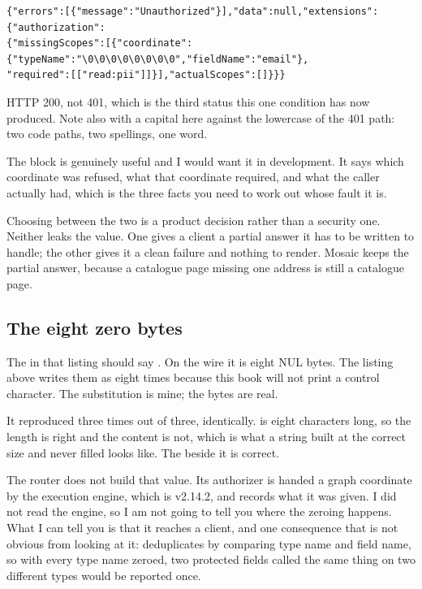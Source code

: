 \begin{verbatim}
{"errors":[{"message":"Unauthorized"}],"data":null,"extensions":{"authorization":
{"missingScopes":[{"coordinate":{"typeName":"\0\0\0\0\0\0\0\0","fieldName":"email"},
"required":[["read:pii"]]}],"actualScopes":[]}}}
\end{verbatim}

HTTP 200, not 401, which is the third status this one condition has now
produced. Note also  with a capital here against the
lowercase  of the 401 path: two code paths, two spellings,
one word.

The  block is genuinely useful and I would want
it in development. It says which coordinate was refused, what that coordinate
required, and what the caller actually had, which is the three facts you need
to work out whose fault it is.

Choosing between the two is a product decision rather than a security one.
Neither leaks the value. One gives a client a partial answer it has to be
written to handle; the other gives it a clean failure and nothing to render.
Mosaic keeps the partial answer, because a catalogue page missing one address
is still a catalogue page.

\subsection*{The eight zero bytes}

%
The  in that listing should say . On the wire it
is eight NUL bytes. The listing above writes them as 
eight times because this book will not print a control character. The
substitution is mine; the bytes are real.

It reproduced three times out of three, identically.  is eight
characters long, so the length is right and the content is not, which is what a
string built at the correct size and never filled looks like. The
 beside it is correct.

The router does not build that value. Its authorizer is handed a graph
coordinate by the execution engine, which is  v2.14.2,
and records what it was given. I did not read the engine, so I am not going to tell you where the
zeroing happens. What I can tell you is that it reaches a client, and one
consequence that is not obvious from looking at it: 
deduplicates by comparing type name and field name, so with every type name
zeroed, two protected fields called the same thing on two different types would
be reported once.

